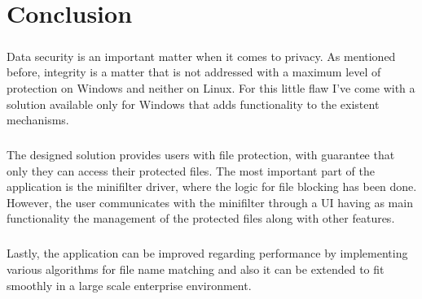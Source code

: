 \chapter{Conclusion}
\paragraph{}
Data security is an important matter when it comes to privacy. As mentioned before, integrity is a matter that is not addressed with a maximum level of protection on Windows and neither on Linux. For this little flaw I've come with a solution available only for Windows that adds functionality to the existent mechanisms. 

\paragraph{}
The designed solution provides users with file protection, with guarantee that only they can access their protected files. The most important part of the application is the minifilter driver, where the logic for file blocking has been done. However, the user communicates with the minifilter through a UI having as main functionality the management of the protected files along with other features.

\paragraph{}
Lastly, the application can be improved regarding performance by implementing various algorithms for file name matching and also it can be extended to fit smoothly in a large scale enterprise environment.
